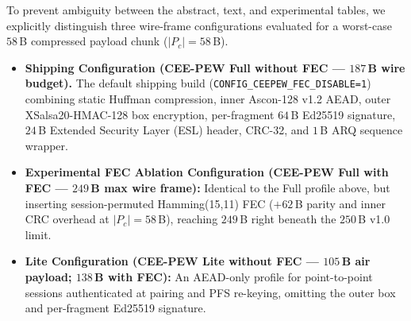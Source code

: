 \documentclass[conference]{IEEEtran}
\begin{document}
To prevent ambiguity between the abstract, text, and experimental tables, we explicitly distinguish three wire-frame configurations evaluated for a worst-case $58$\,B compressed payload chunk ($|P_c|=58$\,B).
\begin{itemize}
\setlength{\itemsep}{0pt}\setlength{\parskip}{0pt}
\item \textbf{Shipping Configuration (CEE-PEW Full without FEC --- $187$\,B wire budget).} The default shipping build (\texttt{CONFIG\_CEEPEW\_FEC\_DISABLE=1}) combining static Huffman compression, inner Ascon-128 v1.2 AEAD, outer XSalsa20-HMAC-128 box encryption, per-fragment $64$\,B Ed25519 signature, $24$\,B Extended Security Layer (ESL) header, CRC-32, and $1$\,B ARQ sequence wrapper.
\item \textbf{Experimental FEC Ablation Configuration (CEE-PEW Full with FEC --- $249$\,B max wire frame):} Identical to the Full profile above, but inserting session-permuted Hamming(15,11) FEC ($+62$\,B parity and inner CRC overhead at $|P_c|=58$\,B), reaching $249$\,B right beneath the $250$\,B v1.0 limit.
\item \textbf{Lite Configuration (CEE-PEW Lite without FEC --- $105$\,B air payload; $138$\,B with FEC):} An AEAD-only profile for point-to-point sessions authenticated at pairing and PFS re-keying, omitting the outer box and per-fragment Ed25519 signature.
\end{itemize}
\end{document}
